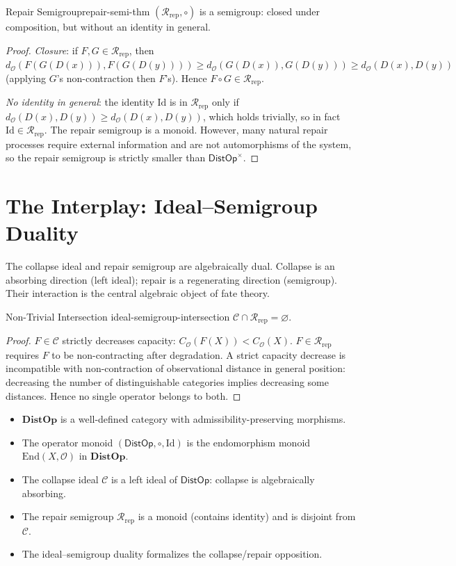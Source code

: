 \documentclass[12pt,twoside,openright]{book}
\newcommand{\obs}{\mathcal{O}}
\newcommand{\distOp}{\mathsf{DistOp}}
\newcommand{\distMetric}{d_{\mathcal{O}}}
\providecommand{\capObs}[1]{C_{\obs}(#1)}
\providecommand{\distOpInv}{\distOp^{\times}}
\newenvironment{appsummary}{%
  \begin{tcolorbox}[colback=DistBlue!5,colframe=DistBlue,
    title={\faBookOpen\enspace Appendix Summary},
    fonttitle=\sffamily\bfseries\color{white},
    attach boxed title to top left={yshift=-2mm,xshift=4mm},
    boxed title style={colback=DistBlue,rounded corners}]
  \begin{itemize}[nosep,leftmargin=*]}{%
  \end{itemize}\end{tcolorbox}}
\providecommand{\collapIdeal}{\mathcal{C}}
\providecommand{\repairSemi}{\mathcal{R}_{\mathrm{rep}}}
\providecommand{\catDistOp}{\mathbf{DistOp}}
\begin{document}
\begin{theorem}{Repair Semigroup}{repair-semi-thm}
$(\repairSemi,\circ)$ is a semigroup: closed under
composition, but without an identity in general.
\begin{proof}
\emph{Closure}: if $F,G\in\repairSemi$, then
$\distMetric(F(G(D(x))),F(G(D(y))))\ge\distMetric(G(D(x)),
G(D(y)))\ge\distMetric(D(x),D(y))$ (applying $G$'s
non-contraction then $F$'s). Hence $F\circ G\in\repairSemi$.

\emph{No identity in general}: the identity $\mathrm{Id}$
is in $\repairSemi$ only if $\distMetric(D(x),D(y))\ge
\distMetric(D(x),D(y))$, which holds trivially, so in fact
$\mathrm{Id}\in\repairSemi$. The repair semigroup is a
monoid. However, many natural repair processes require
external information and are not automorphisms of the system,
so the repair semigroup is strictly smaller than $\distOpInv$.
\end{proof}
\end{theorem}

\section{The Interplay: Ideal--Semigroup Duality}

The collapse ideal and repair semigroup are algebraically
dual. Collapse is an absorbing direction (left ideal); repair
is a regenerating direction (semigroup). Their interaction is
the central algebraic object of fate theory.

\begin{proposition}{Non-Trivial Intersection}%
  {ideal-semigroup-intersection}
$\collapIdeal\cap\repairSemi=\varnothing$.
\begin{proof}
$F\in\collapIdeal$ strictly decreases capacity:
$\capObs{F(X)}<\capObs{X}$. $F\in\repairSemi$ requires
$F$ to be non-contracting after degradation. A strict
capacity decrease is incompatible with non-contraction of
observational distance in general position: decreasing the
number of distinguishable categories implies decreasing some
distances. Hence no single operator belongs to both.
\end{proof}
\end{proposition}

\begin{appsummary}
\item $\catDistOp$ is a well-defined category with
  admissibility-preserving morphisms.
\item The operator monoid $(\distOp,\circ,\mathrm{Id})$ is
  the endomorphism monoid $\mathrm{End}(X,\obs)$ in
  $\catDistOp$.
\item The collapse ideal $\collapIdeal$ is a left ideal of
  $\distOp$: collapse is algebraically absorbing.
\item The repair semigroup $\repairSemi$ is a monoid
  (contains identity) and is disjoint from $\collapIdeal$.
\item The ideal--semigroup duality formalizes the
  collapse/repair opposition.
\end{appsummary}
\end{document}
